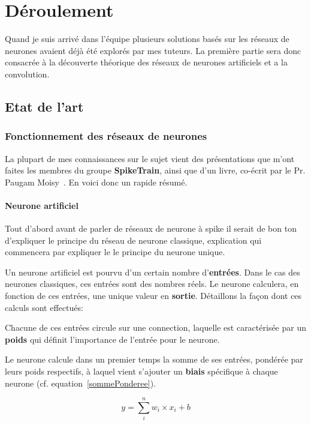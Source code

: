 \hypertarget{Deroulement}{%
\chapter{Déroulement}\label{Déroulement}}

Quand je suis arrivé dans l'équipe plusieurs solutions basés sur les réseaux de neurones avaient déjà été explorés par mes tuteurs.
La première partie sera donc consacrée à la découverte théorique des réseaux de neurones artificiels et a la convolution.

\section{Etat de l'art}
\subsection{Fonctionnement des réseaux de neurones}
La plupart de mes connaissances sur le sujet vient des présentations que m'ont faites les membres du groupe \textbf{SpikeTrain}, ainsi que d'un livre, co-écrit par le Pr. Paugam Moisy~\cite{naturalHandbook}.
En voici donc un rapide résumé.

\subsubsection{Neurone artificiel}
\label{neuroneClassique}
Tout d'abord avant de parler de réseaux de neurone à spike il serait de bon ton d'expliquer le principe du réseau de neurone classique, explication qui commencera par expliquer le
le principe du neurone unique.

Un neurone artificiel est pourvu d'un certain nombre d'\textbf{entrées}. Dans le cas des neurones classiques, ces entrées sont des nombres réels. Le neurone calculera, en fonction de ces entrées, une unique valeur en \textbf{sortie}.
Détaillons la façon dont ces calculs sont effectués:

Chacune de ces entrées circule sur une connection, laquelle est caractérisée par un \textbf{poids} qui définit l'importance de l'entrée pour le neurone.

Le neurone calcule dans un premier temps la somme de ses entrées, pondérée par leurs poids respectifs, à laquel vient s'ajouter un \textbf{biais} spécifique à chaque neurone (cf. equation~\ref{sommePonderee}).

\begin{equation}
\label{sommePonderee}
y = \sum_{i}^{n} w_i \times x_i + b
\end{equation}

